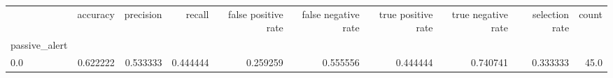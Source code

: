 \begin{tabular}{lrrrrrrrrr}
\toprule
{} &  accuracy &  precision &    recall &  false positive rate &  false negative rate &  true positive rate &  true negative rate &  selection rate &  count \\
passive\_alert &           &            &           &                      &                      &                     &                     &                 &        \\
\midrule
0.0           &  0.622222 &   0.533333 &  0.444444 &             0.259259 &             0.555556 &            0.444444 &            0.740741 &        0.333333 &   45.0 \\
\bottomrule
\end{tabular}
